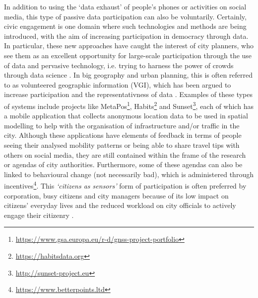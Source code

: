 In addition to using the `data exhaust' of people's phones or activities on social media, this type of passive data participation can also be voluntarily. Certainly, civic engagement is one domain where such technologies and methods are being introduced, with the aim of increasing participation in democracy through data. In particular, these new approaches have caught the interest of city planners, who see them as an excellent opportunity for large-scale participation through the use of data and pervasive technology, i.e. trying to harness the power of crowds through data science \citep{tenney_data-driven_2016}. In big geography and urban planning, this is often referred to as volunteered geographic information (VGI), which has been argued to increase participation and the representativness of data \citep{goodchild_citizens_2007}. Examples of these types of systems include projects like MetaPos\footnote{\url{https://www.gsa.europa.eu/r-d/gnss-project-portfolio}}, Habits\footnote{\url{https://habitsdata.org}} and Sunset\footnote{\url{http://sunset-project.eu}}, each of which has a mobile application that collects anonymous location data to be used in spatial modelling to help with the organisation of infrastructure and/or traffic in the city. Although these applications have elements of feedback in terms of people seeing their analysed mobility patterns or being able to share travel tips with others on social media, they are still contained within the frame of the research or agendas of city authorities. Furthermore, some of these agendas can also be linked to behavioural change (not necessarily bad), which is administered through incentives\footnote{\url{https://www.betterpoints.ltd}}. This \textit{`citizens as sensors'} \citep{berntzen_citizens_2018} form of participation is often preferred by corporation, busy citizens and city managers because of its low impact on citizens' everyday lives and the reduced workload on city officials to actively engage their citizenry \citep{tenney_data-driven_2016}.

